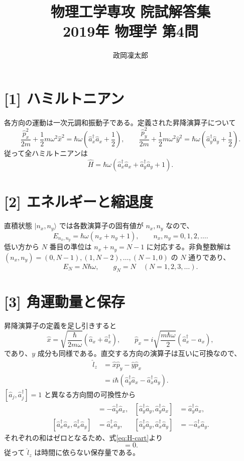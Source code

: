 \documentclass[11pt,a4paper]{article}
\title{物理工学専攻 院試解答集\\2019年 物理学 第4問}
\author{政岡凜太郎}
\date{}
\begin{document}
\maketitle

\section*{[1] ハミルトニアン}
各方向の運動は一次元調和振動子である。定義された昇降演算子について
\[
 \frac{\hat p_x^2}{2m}+\frac12m\omega^2\hat x^2
 =\hbar\omega\left(\hat a_x^\dagger\hat a_x+\frac12\right),
 \qquad
 \frac{\hat p_y^2}{2m}+\frac12m\omega^2\hat y^2
 =\hbar\omega\left(\hat a_y^\dagger\hat a_y+\frac12\right).
\]
従って全ハミルトニアンは
\begin{equation}
 \hat H=\hbar\omega\left(\hat a_x^\dagger\hat a_x+
                         \hat a_y^\dagger\hat a_y+1\right).
 \label{eq:H-cart}
\end{equation}

\section*{[2] エネルギーと縮退度}
直積状態 $|n_x,n_y\rangle$ では各数演算子の固有値が $n_x,n_y$ なので、
\begin{equation}
 E_{n_x,n_y}=\hbar\omega(n_x+n_y+1),\qquad n_x,n_y=0,1,2,\ldots.
 \label{eq:E-cart}
\end{equation}
低い方から $N$ 番目の準位は $n_x+n_y=N-1$ に対応する。非負整数解は
$(n_x,n_y)=(0,N-1),(1,N-2),\ldots,(N-1,0)$ の $N$ 通りであり、
\begin{equation}
 E_N=N\hbar\omega,\qquad g_N=N\quad(N=1,2,3,\ldots).
\end{equation}

\section*{[3] 角運動量と保存}
昇降演算子の定義を足し引きすると
\[
 \hat x=\sqrt{\frac{\hbar}{2m\omega}}(\hat a_x+\hat a_x^\dagger),
 \qquad
 \hat p_x=i\sqrt{\frac{m\hbar\omega}{2}}
                   (\hat a_x^\dagger-\hat a_x),
\]
であり、$y$ 成分も同様である。直交する方向の演算子は互いに可換なので、
\begin{align}
 \hat l_z&=\hat x\hat p_y-\hat y\hat p_x\\
 &=i\hbar(\hat a_y^\dagger\hat a_x-
                   \hat a_x^\dagger\hat a_y).
 \label{eq:l-cart}
\end{align}
$[\hat a_j,\hat a_j^\dagger]=1$ と異なる方向間の可換性から
\begin{align}
 [\hat a_x^\dagger\hat a_x,\hat a_y^\dagger\hat a_x]&=-\hat a_y^\dagger\hat a_x,
 & [\hat a_y^\dagger\hat a_y,\hat a_y^\dagger\hat a_x]&=\hat a_y^\dagger\hat a_x,\\
 [\hat a_x^\dagger\hat a_x,\hat a_x^\dagger\hat a_y]&=\hat a_x^\dagger\hat a_y,
 & [\hat a_y^\dagger\hat a_y,\hat a_x^\dagger\hat a_y]&=-\hat a_x^\dagger\hat a_y.
\end{align}
それぞれの和はゼロとなるため、式\eqref{eq:H-cart}より
\begin{equation}
 [\hat H,\hat l_z]=0.
\end{equation}
従って $\hat l_z$ は時間に依らない保存量である。
\end{document}
